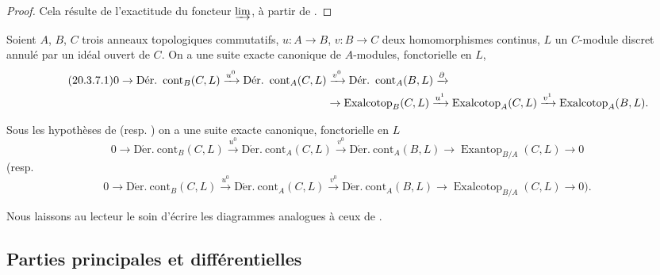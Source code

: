 \begin{proof}
Cela résulte de l'exactitude du foncteur $\varinjlim$, à partir de
.
\end{proof}

\begin{corollary}[20.3.7]
\label{0.20.3.7-fr}
Soient $A$, $B$, $C$ trois anneaux topologiques commutatifs, $u:A\to B$,
$v:B\to C$ deux homomorphismes continus, $L$ un $C$-module discret annulé
par un idéal ouvert de $C$. On a une suite exacte canonique de $A$-modules,
fonctorielle en $L$,
\begin{align}
\tag{20.3.7.1}
\label{0.20.3.7.1-fr}
  0\to\operatorname{D\acute{e}r.\ cont}_B(C,L)\xrightarrow{u^0}
  \operatorname{D\acute{e}r.\ cont}_A(C,L)&\xrightarrow{v^0}
  \operatorname{D\acute{e}r.\ cont}_A(B,L)\xrightarrow{\partial} \\
  &\to\operatorname{Exalcotop}_B(C,L)\xrightarrow{u^1}
  \operatorname{Exalcotop}_A(C,L)\xrightarrow{v^1}
  \operatorname{Exalcotop}_A(B,L). \notag
\end{align}
\end{corollary}

\begin{corollary}[20.3.8]
\label{0.20.3.8-fr}
Sous les hypothèses de  (resp.
) on a une suite exacte canonique, fonctorielle en $L$
\begin{equation}
\tag{20.3.8.1}
\label{0.20.3.8.1-fr}
  0\to\operatorname{D\acute{e}r.\ cont}_B(C,L)\xrightarrow{u^0}
  \operatorname{D\acute{e}r.\ cont}_A(C,L)\xrightarrow{v^0}
  \operatorname{D\acute{e}r.\ cont}_A(B,L)\to
  \operatorname{Exantop}_{B/A}(C,L)\to0
\end{equation}
(resp.
\begin{equation}
\tag{20.3.8.2}
\label{0.20.3.8.2-fr}
  0\to\operatorname{D\acute{e}r.\ cont}_B(C,L)\xrightarrow{u^0}
  \operatorname{D\acute{e}r.\ cont}_A(C,L)\xrightarrow{v^0}
  \operatorname{D\acute{e}r.\ cont}_A(B,L)\to
  \operatorname{Exalcotop}_{B/A}(C,L)\to0\text{).}
\end{equation}
\end{corollary}

Nous laissons au lecteur le soin d'écrire les diagrammes analogues à ceux de
.

\subsection{Parties principales et différentielles}
\label{subsection:0.20.4-fr}


